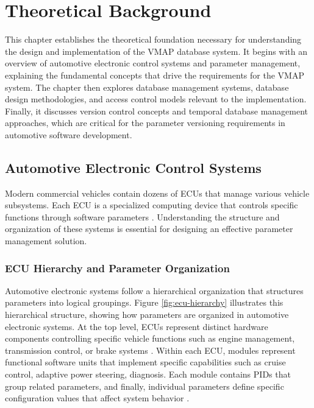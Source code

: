\chapter{Theoretical Background}
\label{chap:theoretical-background}

This chapter establishes the theoretical foundation necessary for understanding the design and implementation of the \ac{VMAP} database system. It begins with an overview of automotive electronic control systems and parameter management, explaining the fundamental concepts that drive the requirements for the \ac{VMAP} system. The chapter then explores database management systems, database design methodologies, and access control models relevant to the implementation. Finally, it discusses version control concepts and temporal database management approaches, which are critical for the parameter versioning requirements in automotive software development.

\section{Automotive Electronic Control Systems}
\label{sec:automotive-electronic-systems}

Modern commercial vehicles contain dozens of \acp{ECU} that manage various vehicle subsystems. Each \ac{ECU} is a specialized computing device that controls specific functions through software parameters \cite{staron2021automotive}. Understanding the structure and organization of these systems is essential for designing an effective parameter management solution.

\subsection{\ac{ECU} Hierarchy and Parameter Organization}
\label{subsec:ecu-hierarchy}

Automotive electronic systems follow a hierarchical organization that structures parameters into logical groupings. Figure \ref{fig:ecu-hierarchy} illustrates this hierarchical structure, showing how parameters are organized in automotive electronic systems. At the top level, \acp{ECU} represent distinct hardware components controlling specific vehicle functions such as engine management, transmission control, or brake systems \cite{kiencke2000automotive}. Within each \ac{ECU}, modules represent functional software units that implement specific capabilities such as cruise control, adaptive power steering, diagnosis. Each module contains \acp{PID} that group related parameters, and finally, individual parameters define specific configuration values that affect system behavior \cite{staron2021autosar}.

